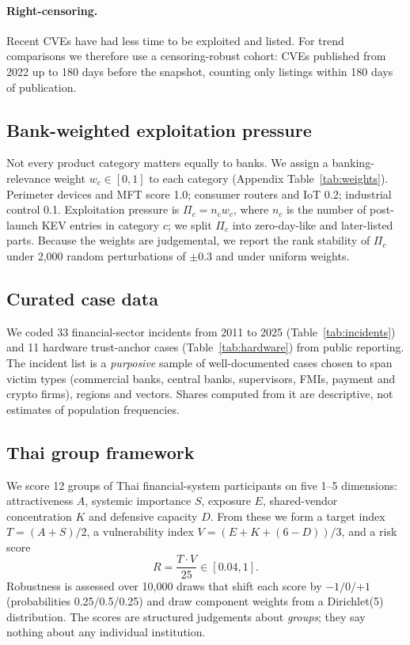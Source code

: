 \documentclass[11pt,a4paper]{article}
\begin{document}
\paragraph{Right-censoring.} Recent CVEs have had less time to be exploited and listed. For trend comparisons we therefore use a censoring-robust cohort: CVEs published from 2022 up to 180 days before the snapshot, counting only listings within 180 days of publication.

\subsection{Bank-weighted exploitation pressure}
Not every product category matters equally to banks. We assign a banking-relevance weight $w_c\in[0,1]$ to each category (Appendix Table~\ref{tab:weights}). Perimeter devices and MFT score 1.0; consumer routers and IoT 0.2; industrial control 0.1. Exploitation pressure is $\Pi_c = n_c w_c$, where $n_c$ is the number of post-launch KEV entries in category $c$; we split $\Pi_c$ into zero-day-like and later-listed parts. Because the weights are judgemental, we report the rank stability of $\Pi_c$ under 2,000 random perturbations of $\pm0.3$ and under uniform weights.

\subsection{Curated case data}
We coded 33 financial-sector incidents from 2011 to 2025 (Table~\ref{tab:incidents}) and 11 hardware trust-anchor cases (Table~\ref{tab:hardware}) from public reporting. The incident list is a \emph{purposive} sample of well-documented cases chosen to span victim types (commercial banks, central banks, supervisors, FMIs, payment and crypto firms), regions and vectors. Shares computed from it are descriptive, not estimates of population frequencies.

\subsection{Thai group framework}
We score 12 groups of Thai financial-system participants on five 1--5 dimensions: attractiveness $A$, systemic importance $S$, exposure $E$, shared-vendor concentration $K$ and defensive capacity $D$. From these we form a target index $T=(A+S)/2$, a vulnerability index $V=(E+K+(6-D))/3$, and a risk score
\begin{equation}
R = \frac{T\cdot V}{25}\in[0.04,1].
\end{equation}
Robustness is assessed over 10,000 draws that shift each score by $-1/0/{+1}$ (probabilities 0.25/0.5/0.25) and draw component weights from a Dirichlet(5) distribution. The scores are structured judgements about \emph{groups}; they say nothing about any individual institution.
\end{document}
